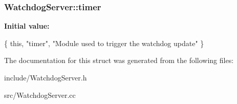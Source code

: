 \subsubsection[{\texorpdfstring{timer}{timer}}]{ Watchdog\+Server\+::timer}\hypertarget{structWatchdogServer_a008378faf036ce07afc07b768c7df263}{}\label{structWatchdogServer_a008378faf036ce07afc07b768c7df263}
{\bfseries Initial value\+:}
\begin{DoxyCode}
\{ \textcolor{keyword}{this}, \textcolor{stringliteral}{"timer"},
      \textcolor{stringliteral}{"Module used to trigger the watchdog update"} \}
\end{DoxyCode}


The documentation for this struct was generated from the following files\+:\begin{DoxyCompactItemize}
\item 
include/Watchdog\+Server.\+h\item 
src/Watchdog\+Server.\+cc\end{DoxyCompactItemize}
